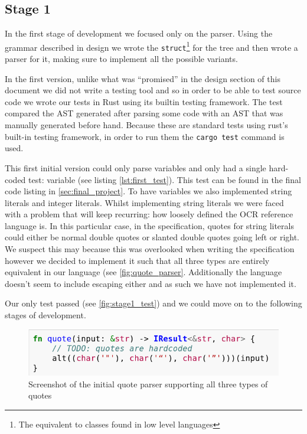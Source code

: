 \documentclass{article}
\begin{document}
\subsection{Stage 1}

In the first stage of development we focused only on the parser. Using the
grammar described in design we wrote the \texttt{struct}\footnote{The
equivalent to classes found in low level languages} for the tree and then wrote
a parser for it, making sure to implement all the possible variants.

In the first version, unlike what was ``promised'' in the design section of
this document we did not write a testing tool and so in order to be able to
test source code we wrote our tests in Rust using its builtin testing
framework. The test compared the AST generated after parsing some code with an
AST that was manually generated before hand. Because these are standard tests
using rust's built-in testing framework, in order to run them the \texttt{cargo
test} command is used.

This first initial version could only parse variables and only had a single
hard-coded test: variable (see listing \ref{lst:first_test}). This test can be
found in the final code listing in \autoref{sec:final_project}. To have
variables we also implemented string literals and integer literals. Whilst
implementing string literals we were faced with a problem that will keep
recurring: how loosely defined the OCR reference language is. In this
particular case, in the specification, quotes for string literals could either
be normal double quotes or slanted double quotes going left or right. We
suspect this may because this was overlooked when writing the specification
however we decided to implement it such that all three types are entirely
equivalent in our language (see \autoref{fig:quote_parser}. Additionally the
language doesn't seem to include escaping either and as such we have not
implemented it.

Our only test passed (see \autoref{fig:stage1_test}) and we could move on to
the following stages of development.

\begin{figure}
	\includegraphics[width=\textwidth]{initial_quote}
	\caption[Screenshot of the initial quote parser supporting all three types of quotes]{Screenshot\footnotemark{} of the initial quote parser supporting all three types of quotes}
	\label{fig:quote_parser}
\end{figure}
\end{document}
